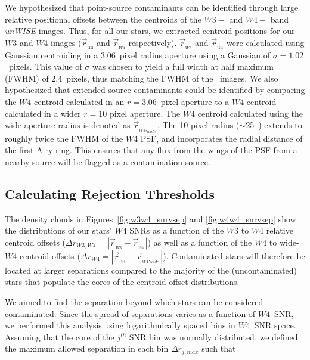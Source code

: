     We hypothesized that point-source contaminants can be identified through large relative positional offsets between the centroids of the $W3-$ and $W4-$ band \textit{unWISE} images. Thus, for all our stars, we extracted centroid positions for our $W3$ and $W4$ images ($\vec{r}_{_{W3}}$ and $\vec{r}_{_{W4}}$ respectively). $\vec{r}_{_{W3}}$ and $\vec{r}_{_{W4}}$ were calculated using Gaussian centroiding in a 3.06~pixel radius aperture using a Gaussian of $\sigma=1.02$~pixels. This value of $\sigma$ was chosen to yield a full width at half maximum (FWHM) of 2.4~pixels, thus matching the FWHM of the \WS\ images. We also hypothesized that extended source contaminants could be identified by comparing the $W4$ centroid calculated in an $r=3.06$~pixel aperture to a $W4$ centroid calculated in a wider $r=10$ pixel aperture.  The $W4$ centroid calculated using the wide aperture radius is denoted as $\vec{r}_{_{W4},_{wide}}$. The 10 pixel radius ($\sim$25\arcsec\ ) extends to roughly twice the FWHM of the $W4$ PSF, and incorporates the radial distance of the first Airy ring. This ensures that any flux from the wings of the PSF from a nearby source will be flagged as a contamination source. 
    
    
    \subsection{Calculating Rejection Thresholds}\label{sec:unwise_rejectmethod}
 
    
    The density clouds in Figures~\ref{fig:w3w4_snrvsep} and \ref{fig:w4w4_snrvsep} show the distributions of our stars' $W4$ SNRs as a function of the $W3$ to $W4$ relative centroid offsets ($\Delta r_{W3,W4} = \left|\vec{r}_{_{W3}} - \vec{r}_{_{W4}}\right|$) as well as a function of the $W4$ to wide-$W4$ centroid offsets ($\Delta r_{W4} = \left|\vec{r}_{_{W4}} - \vec{r}_{_{W4},_{wide}}\right|$). Contaminated stars will therefore be located at larger separations compared to the majority of the (uncontaminated) stars that populate the cores of the centroid offset distributions. 
    
    We aimed to find the separation beyond which stars can be considered contaminated. Since the spread of separations varies as a function of $W4$~SNR, we performed this analysis using logarithmically spaced bins in $W4$~SNR space. Assuming that the core of the $j^{th}$ SNR bin was normally distributed, we defined the maximum allowed separation in each bin $\Delta r_{j,max}$ such that 
    
